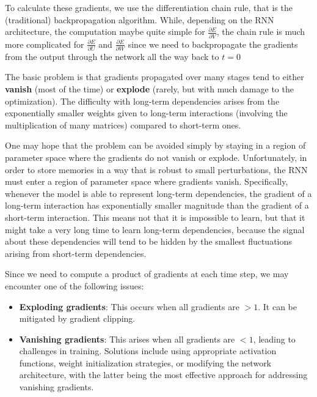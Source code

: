 To calculate these gradients, we use the differentiation chain rule, that is the (traditional) 
backpropagation algorithm. While, depending on the RNN architecture, the computation maybe quite 
simple for $\frac{\partial E}{\partial V}$, the chain rule is much more complicated for $\frac{\partial E}{\partial U}$
and $\frac{\partial E}{\partial W}$ since we need to backpropagate the gradients from the output through the 
network all the way back to $t = 0$

The basic problem is that gradients propagated over many stages tend to either \textbf{vanish} (most of 
the time) or \textbf{explode} (rarely, but with much damage to the optimization). The difficulty with 
long-term dependencies arises from the exponentially smaller weights given to long-term interactions 
(involving the multiplication of many matrices) compared to short-term ones.

One may hope that the problem can be avoided simply by staying in a region of parameter space where 
the gradients do not vanish or explode. Unfortunately, in order to store memories in a way that is robust 
to small perturbations, the RNN must enter a region of parameter space where gradients vanish. Specifically, 
whenever the model is able to represent long-term dependencies, the gradient of a long-term interaction 
has exponentially smaller magnitude than the gradient of a short-term interaction. This means not that it 
is impossible to learn, but that it might take a very long time to learn long-term dependencies, because the 
signal about these dependencies will tend to be hidden by the smallest fluctuations arising from short-term dependencies.

Since we need to compute a product of gradients at each time step, we may encounter one of the following issues:
\begin{itemize}
    \item \textbf{Exploding gradients}: This occurs when all gradients are $> 1$. It can be mitigated 
        by gradient clipping.
    \item \textbf{Vanishing gradients}: This arises when all gradients are $< 1$, leading to challenges 
        in training. Solutions include using appropriate activation functions, weight initialization 
        strategies, or modifying the network architecture, with the latter being the most effective 
        approach for addressing vanishing gradients.
\end{itemize}

